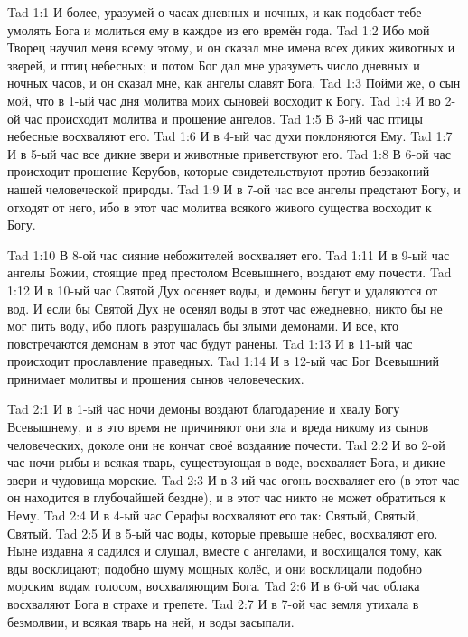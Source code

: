 

\vs Tad 1:1
И более, уразумей о часах дневных и ночных,
и как подобает тебе умолять Бога
и молиться ему в каждое из его времён года.
\vs Tad 1:2
Ибо мой Творец научил меня всему этому,
и он сказал мне имена всех диких животных и зверей,
и птиц небесных;
и потом Бог дал мне уразуметь число дневных и ночных часов,
и он сказал мне, как ангелы славят Бога.
\vs Tad 1:3
Пойми же, о сын мой, что в 1-ый час дня
молитва
моих сыновей
восходит к Богу.
\vs Tad 1:4
И во 2-ой час происходит молитва и прошение ангелов.
\vs Tad 1:5
В 3-ий час птицы небесные восхваляют его.
\vs Tad 1:6
И в 4-ый час
духи
поклоняются Ему.
\vs Tad 1:7
И в 5-ый час все
дикие звери и животные
приветствуют его.
\vs Tad 1:8
В 6-ой час происходит прошение Керубов,
которые свидетельствуют против
беззаконий нашей человеческой природы.
\vs Tad 1:9
И в 7-ой час все ангелы предстают Богу,
и отходят от него, ибо в этот час молитва
всякого живого существа восходит к Богу.

\vs Tad 1:10
В 8-ой час сияние
небожителей
восхваляет его.
\vs Tad 1:11
И в 9-ый час ангелы Божии, стоящие пред престолом Всевышнего,
воздают ему почести.
\vs Tad 1:12
И в 10-ый час Святой Дух осеняет воды,
и демоны бегут и удаляются от вод.
И если бы Святой Дух не осенял воды в этот час ежедневно,
никто бы не мог пить воду,
ибо плоть разрушалась бы злыми демонами. 
И все, кто повстречаются демонам в этот час будут ранены.
\vs Tad 1:13
И в 11-ый час происходит прославление праведных.
\vs Tad 1:14
И в 12-ый час Бог Всевышний принимает молитвы
и прошения сынов человеческих.
 

\vs Tad 2:1
И в 1-ый час ночи демоны воздают благодарение и хвалу Богу Всевышнему,
и в это время не причиняют они зла и вреда никому из сынов человеческих,
доколе они не кончат своё воздаяние почести.
\vs Tad 2:2
И во 2-ой час ночи
рыбы
и всякая тварь, существующая в воде,
восхваляет Бога, и дикие звери и чудовища морские.
\vs Tad 2:3
И в 3-ий час огонь восхваляет его
(в этот час он находится в глубочайшей бездне),
и в этот час никто не может обратиться к Нему.
\vs Tad 2:4
И в 4-ый час Серафы восхваляют его так: Святый, Святый, Святый.
\vs Tad 2:5
И в 5-ый час воды, которые превыше небес,
восхваляют его.
Ныне издавна я садился и слушал, вместе с ангелами, и восхищался тому,
как в\acc{о}ды восклицают;
подобно шуму мощных
колёс,
и они восклицали подобно морским водам голосом,
восхваляющим Бога.
\vs Tad 2:6
И в 6-ой час облака восхваляют Бога в страхе и трепете.
\vs Tad 2:7
И в 7-ой час земля утихала в безмолвии,
и всякая тварь на ней, и воды засыпали. 

